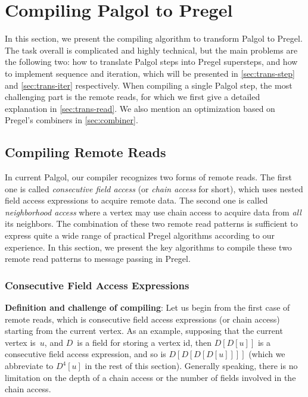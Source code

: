 \documentclass{sokendai_thesis} %
\begin{document}
\chapter{Compiling Palgol to Pregel}
\label{sec:compilation}

In this section, we present the compiling algorithm to transform Palgol to Pregel.
The task overall is complicated and highly technical, but the main problems are the following two: how to translate Palgol steps into Pregel supersteps, and how to implement sequence and iteration, which will be presented in \autoref{sec:trans-step} and \autoref{sec:trans-iter} respectively.
When compiling a single Palgol step, the most challenging part is the remote reads, for which we first give a detailed explanation in \autoref{sec:trans-read}.
We also mention an optimization based on Pregel's combiners in \autoref{sec:combiner}.

\section{Compiling Remote Reads}
\label{sec:trans-read}

In current Palgol, our compiler recognizes two forms of remote reads.
The first one is called \emph{consecutive field access} (or \emph{chain access} for short), which uses nested field access expressions to acquire remote data.
The second one is called \emph{neighborhood access} where a vertex may use chain access to acquire data from \emph{all} its neighbors.
The combination of these two remote read patterns is sufficient to express quite a wide range of practical Pregel algorithms according to our experience.
In this section, we present the key algorithms to compile these two remote read patterns to message passing in Pregel.

\subsection{Consecutive Field Access Expressions}
\label{sec:consecutive}

\textbf{Definition and challenge of compiling}:
Let us begin from the first case of remote reads, which is consecutive field access expressions (or chain access) starting from the current vertex.
As an example, supposing that the current vertex is~$u$, and $D$~is a field for storing a vertex id, then $D[D[u]]$ is a consecutive field access expression, and so is $D[D[D[D[u]]]]$ (which we abbreviate to $D^4[u]$ in the rest of this section).
Generally speaking, there is no limitation on the depth of a chain access or the number of fields involved in the chain access.
\end{document}

